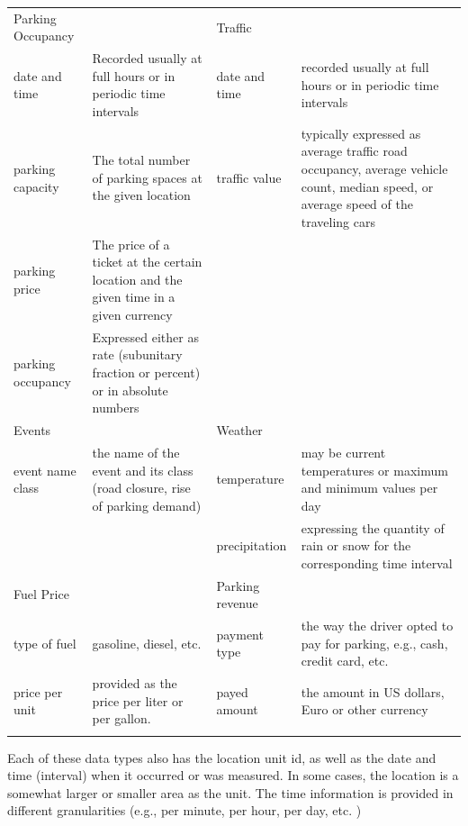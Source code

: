 \begin{table}
	{\begin{tabular}{lp{4cm}lp{4cm}}	
		\toprule
		Parking Occupancy & & Traffic & \\
		\colrule
		date and time & Recorded usually at full hours or in periodic time intervals & date and time & recorded usually at full hours or in periodic time intervals \\
		parking capacity & The total number of parking spaces at the given location & traffic value & typically expressed as average traffic road occupancy, average vehicle count, median speed, or average speed of the traveling cars \\
		parking price & The price of a ticket at the certain location and the given time in a given currency & & \\
		parking occupancy & Expressed either as rate (subunitary fraction or percent) or in absolute numbers & & \\
		\colrule
		Events & & Weather & \\
		\colrule
		event name class & the name of the event and its class (road closure, rise of parking demand) & temperature & may be current temperatures or maximum and minimum values per day \\
		& & 	precipitation & expressing the quantity of rain or snow for the corresponding time interval \\
		\colrule
		Fuel Price & & Parking revenue & \\
		\colrule
		type of fuel & gasoline, diesel, etc. & payment type & the way the driver opted to pay for parking, e.g., cash, credit card, etc. \\
		
		price per unit & provided as the price per liter or per gallon. & payed amount & the amount in US dollars, Euro or other currency\\
		
		\botrule
	\end{tabular}}
	\begin{tabnote}
		Each of these data types also has the location unit id, as well as the date and time (interval) when it occurred or was measured. 
		In some cases, the location is a somewhat larger or smaller area as the unit. The time information is provided in different granularities (e.g., per minute, per hour, per day, etc. )
	\end{tabnote}
	\label{tab:sfpark_data}
\end{table}

